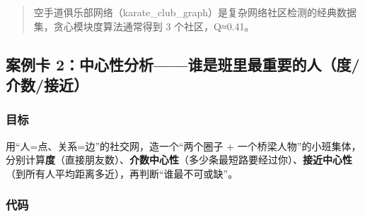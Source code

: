\begin{quote}
空手道俱乐部网络（karate\_club\_graph）是复杂网络社区检测的经典数据集，贪心模块度算法通常得到
3 个社区，Q≈0.41。
\end{quote}

\subsection{案例卡
2：中心性分析------谁是班里最重要的人（度/介数/接近）}\label{ux6848ux4f8bux5361-2ux4e2dux5fc3ux6027ux5206ux6790ux8c01ux662fux73edux91ccux6700ux91cdux8981ux7684ux4ebaux5ea6ux4ecbux6570ux63a5ux8fd1}

\subsubsection{目标}\label{ux76eeux6807-25}

用``人=点、关系=边''的社交网，造一个``两个圈子 +
一个桥梁人物''的小班集体，分别计算\textbf{度}（直接朋友数）、\textbf{介数中心性}（多少条最短路要经过你）、\textbf{接近中心性}（到所有人平均距离多近），再判断``谁最不可或缺''。

\subsubsection{代码}\label{ux4ee3ux7801-26}

